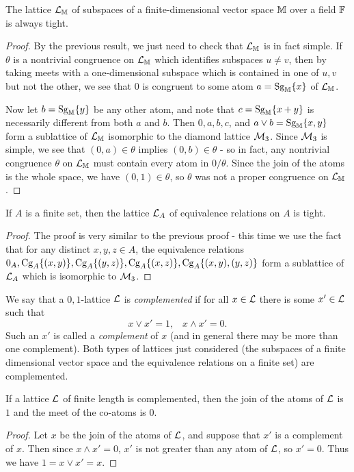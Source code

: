 \begin{appendices}
\begin{prop} The lattice $\mathcal{L}_{\mathbb{M}}$ of subspaces of a finite-dimensional vector space $\mathbb{M}$ over a field $\mathbb{F}$ is always tight.
\end{prop}
\begin{proof} By the previous result, we just need to check that $\mathcal{L}_{\mathbb{M}}$ is in fact simple. If $\theta$ is a nontrivial congruence on $\mathcal{L}_{\mathbb{M}}$ which identifies subspaces $u \ne v$, then by taking meets with a one-dimensional subspace which is contained in one of $u,v$ but not the other, we see that $0$ is congruent to some atom $a = \operatorname{Sg}_{\mathbb{M}}\{x\}$ of $\mathcal{L}_{\mathbb{M}}$.

Now let $b = \operatorname{Sg}_{\mathbb{M}}\{y\}$ be any other atom, and note that $c = \operatorname{Sg}_{\mathbb{M}}\{x+y\}$ is necessarily different from both $a$ and $b$. Then $0, a, b, c$, and $a \vee b = \operatorname{Sg}_{\mathbb{M}}\{x,y\}$ form a sublattice of $\mathcal{L}_{\mathbb{M}}$ isomorphic to the diamond lattice $\mathcal{M}_3$. Since $\mathcal{M}_3$ is simple, we see that $(0,a) \in \theta$ implies $(0,b) \in \theta$ - so in fact, any nontrivial congruence $\theta$ on $\mathcal{L}_{\mathbb{M}}$ must contain every atom in $0/\theta$. Since the join of the atoms is the whole space, we have $(0,1) \in \theta$, so $\theta$ was not a proper congruence on $\mathcal{L}_{\mathbb{M}}$.
\end{proof}

\begin{prop} If $A$ is a finite set, then the lattice $\mathcal{L}_A$ of equivalence relations on $A$ is tight.
\end{prop}
\begin{proof} The proof is very similar to the previous proof - this time we use the fact that for any distinct $x,y,z \in A$, the equivalence relations $0_A, \operatorname{Cg}_A\{(x,y)\}, \operatorname{Cg}_A\{(y,z)\}, \operatorname{Cg}_A\{(x,z)\}, \operatorname{Cg}_A\{(x,y),(y,z)\}$ form a sublattice of $\mathcal{L}_A$ which is isomorphic to $\mathcal{M}_3$.
\end{proof}

We say that a $0,1$-lattice $\mathcal{L}$ is \emph{complemented} if for all $x \in \mathcal{L}$ there is some $x' \in \mathcal{L}$ such that
\[
x \vee x' = 1, \;\;\; x \wedge x' = 0.
\]
Such an $x'$ is called a \emph{complement} of $x$ (and in general there may be more than one complement). Both types of lattices just considered (the subspaces of a finite dimensional vector space and the equivalence relations on a finite set) are complemented.

\begin{prop} If a lattice $\mathcal{L}$ of finite length is complemented, then the join of the atoms of $\mathcal{L}$ is $1$ and the meet of the co-atoms is $0$.
\end{prop}
\begin{proof} Let $x$ be the join of the atoms of $\mathcal{L}$, and suppose that $x'$ is a complement of $x$. Then since $x \wedge x' = 0$, $x'$ is not greater than any atom of $\mathcal{L}$, so $x' = 0$. Thus we have $1 = x \vee x' = x$.
\end{proof}


\end{appendices}
